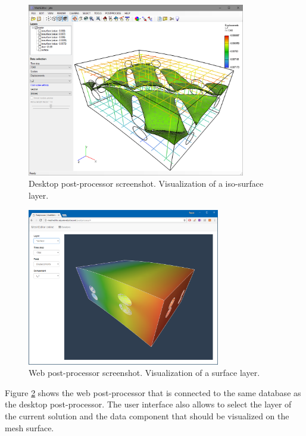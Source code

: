 \begin{figure}[H]
    \centering
    \includegraphics[width=0.85\textwidth]{figures/chapter-data-management/desktop-postprocessor-isosurface}
    \decoRule
    \caption{Desktop post-processor screenshot. Visualization of a iso-surface layer.}
    \label{fig:desktop-postprocessor-isosurface}
\end{figure}


\begin{figure}[H]
    \centering
    \includegraphics[width=0.75\textwidth]{figures/chapter-data-management/web-postprocessor-surface}
    \decoRule
    \caption{Web post-processor screenshot. Visualization of a surface layer.}
    \label{fig:web-postprocessor-surface}
\end{figure}

Figure \ref{fig:web-postprocessor-surface} shows the web post-processor that is connected to the same database as the desktop post-processor. The user interface also allows to select the layer of the current solution and the data component that should be visualized on the mesh surface.

